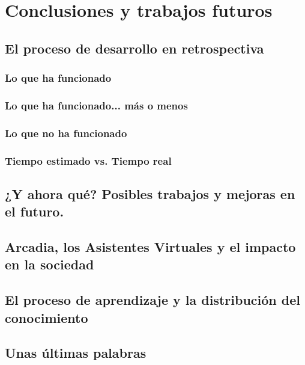 \chapter{Conclusiones y trabajos futuros}
\section{El proceso de desarrollo en retrospectiva}
\subsection{Lo que ha funcionado}
\subsection{Lo que ha funcionado... más o menos}
\subsection{Lo que no ha funcionado}
\subsection{Tiempo estimado vs. Tiempo real}

\section{¿Y ahora qué? Posibles trabajos y mejoras en el futuro.}

\section{Arcadia, los Asistentes Virtuales y el impacto en la sociedad}

\section{El proceso de aprendizaje y la distribución del conocimiento}

\section{Unas últimas palabras}
